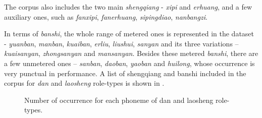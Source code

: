 The corpus also includes the two main \textit{shengqiang} - \textit{xipi} and \textit{erhuang}, and a few auxiliary ones, such as \textit{fanxipi}, \textit{fanerhuang}, \textit{sipingdiao}, \textit{nanbangzi}.

In terms of \textit{banshi}, the whole range of metered ones is represented in the dataset - \textit{yuanban}, \textit{manban}, \textit{kuaiban}, \textit{erliu}, \textit{liushui}, \textit{sanyan} and its three variations -- \textit{kuaisanyan}, \textit{zhongsanyan} and \textit{mansanyan}. Besides these metered \textit{banshi}, there are a few unmetered ones -- \textit{sanban}, \textit{daoban}, \textit{yaoban} and \textit{huilong}, whose occurrence is very punctual in performance. A list of shengqiang and banshi included in the corpus for \textit{dan} and \textit{laosheng} role-types is shown in .

\begin{figure}[ht!]
    \centering
    \hfill
  
    \caption[]{Number of occurrence for each phoneme of dan and laosheng role-types.}
    \label{fig:ch4:number_occurrence}
\end{figure}

